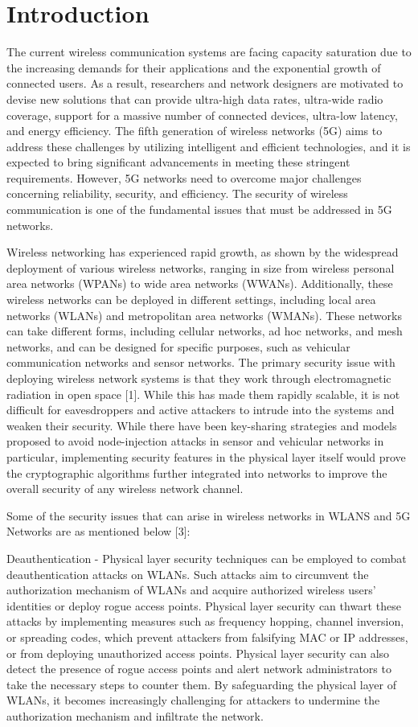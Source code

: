 \documentclass[conference]{IEEEtran}
\begin{document}
\section{Introduction}
The current wireless communication systems are facing capacity saturation due to the increasing demands for their applications and the exponential growth of connected users. As a result, researchers and network designers are motivated to devise new solutions that can provide ultra-high data rates, ultra-wide radio coverage, support for a massive number of connected devices, ultra-low latency, and energy efficiency. The fifth generation of wireless networks (5G) aims to address these challenges by utilizing intelligent and efficient technologies, and it is expected to bring significant advancements in meeting these stringent requirements. However, 5G networks need to overcome major challenges concerning reliability, security, and efficiency. The security of wireless communication is one of the fundamental issues that must be addressed in 5G networks.

Wireless networking has experienced rapid growth, as shown by the widespread deployment of various wireless networks, ranging in size from wireless personal area networks (WPANs) to wide area networks (WWANs).  Additionally, these wireless networks can be deployed in different settings, including local area networks (WLANs) and metropolitan area networks (WMANs). These networks can take different forms, including cellular networks, ad hoc networks, and mesh networks, and can be designed for specific purposes, such as vehicular communication networks and sensor networks. The primary security issue with deploying wireless network systems is that they work through electromagnetic radiation in open space [1]. While this has made them rapidly scalable, it is not difficult for eavesdroppers and active attackers to intrude into the systems and weaken their security. While there have been key-sharing strategies and models proposed to avoid node-injection attacks in sensor and vehicular networks in particular, implementing security features in the physical layer itself would prove the cryptographic algorithms further integrated into networks to improve the overall security of any wireless network channel.

Some of the security issues that can arise in wireless networks in WLANS and 5G Networks are as mentioned below [3]:

Deauthentication - Physical layer security techniques can be employed to combat deauthentication attacks on WLANs. Such attacks aim to circumvent the authorization mechanism of WLANs and acquire authorized wireless users' identities or deploy rogue access points. Physical layer security can thwart these attacks by implementing measures such as frequency hopping, channel inversion, or spreading codes, which prevent attackers from falsifying MAC or IP addresses, or from deploying unauthorized access points. Physical layer security can also detect the presence of rogue access points and alert network administrators to take the necessary steps to counter them. By safeguarding the physical layer of WLANs, it becomes increasingly challenging for attackers to undermine the authorization mechanism and infiltrate the network.
\end{document}
